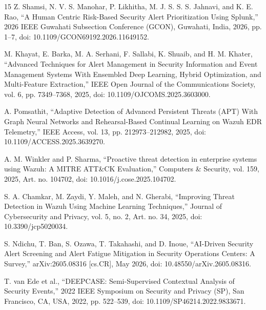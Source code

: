 \documentclass[10pt,letterpaper]{article}
\begin{document}
\begin{thebibliography}{15}
 Z. Shamsi, N. V. S. Manohar, P. Likhitha, M. J. S. S. S. Jahnavi, and K. E. Rao, ``A Human Centric Risk-Based Security Alert Prioritization Using Splunk,'' 2026 IEEE Guwahati Subsection Conference (GCON), Guwahati, India, 2026, pp. 1--7, doi: 10.1109/GCON69192.2026.11649152.

 M. Khayat, E. Barka, M. A. Serhani, F. Sallabi, K. Shuaib, and H. M. Khater, ``Advanced Techniques for Alert Management in Security Information and Event Management Systems With Ensembled Deep Learning, Hybrid Optimization, and Multi-Feature Extraction,'' IEEE Open Journal of the Communications Society, vol. 6, pp. 7349--7368, 2025, doi: 10.1109/OJCOMS.2025.3603000.

 A. Pomsathit, ``Adaptive Detection of Advanced Persistent Threats (APT) With Graph Neural Networks and Rehearsal-Based Continual Learning on Wazuh EDR Telemetry,'' IEEE Access, vol. 13, pp. 212973--212982, 2025, doi: 10.1109/ACCESS.2025.3639270.

 A. M. Winkler and P. Sharma, ``Proactive threat detection in enterprise systems using Wazuh: A MITRE ATT\&CK Evaluation,'' Computers \& Security, vol. 159, 2025, Art. no. 104702, doi: 10.1016/j.cose.2025.104702.

 S. A. Chamkar, M. Zaydi, Y. Maleh, and N. Gherabi, ``Improving Threat Detection in Wazuh Using Machine Learning Techniques,'' Journal of Cybersecurity and Privacy, vol. 5, no. 2, Art. no. 34, 2025, doi: 10.3390/jcp5020034.

 S. Ndichu, T. Ban, S. Ozawa, T. Takahashi, and D. Inoue, ``AI-Driven Security Alert Screening and Alert Fatigue Mitigation in Security Operations Centers: A Survey,'' arXiv:2605.08316 [cs.CR], May 2026, doi: 10.48550/arXiv.2605.08316.

 T. van Ede et al., ``DEEPCASE: Semi-Supervised Contextual Analysis of Security Events,'' 2022 IEEE Symposium on Security and Privacy (SP), San Francisco, CA, USA, 2022, pp. 522--539, doi: 10.1109/SP46214.2022.9833671.

\end{thebibliography}
\end{document}
